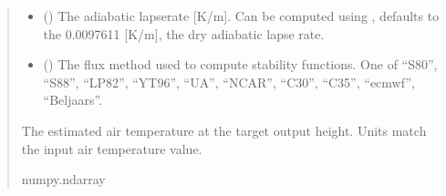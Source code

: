 \documentclass[letterpaper,10pt,english]{sphinxmanual}
\begin{document}
\begin{fulllineitems}
\begin{quote}
\begin{description}
\begin{itemize}
\item {}
\sphinxAtStartPar
{} (\sphinxstyleliteralemphasis{\sphinxupquote{ | }}) \textendash{} The adiabatic lapse\sphinxhyphen{}rate {[}K/m{]}. Can be computed using
{\hyperref[\detokenize{users_guide:AirSeaFluxCode.hum_subs.gamma}]{}}, defaults to the 0.0097611 {[}K/m{]}, the
dry adiabatic lapse rate.

\item {}
\sphinxAtStartPar
{} () \textendash{} The flux method used to compute stability functions. One of “S80”, “S88”,
“LP82”, “YT96”, “UA”, “NCAR”, “C30”, “C35”, “ecmwf”, “Beljaars”.

\end{itemize}

\sphinxAtStartPar
The estimated air temperature at the target output height. Units match
the input air temperature value.

\sphinxAtStartPar
numpy.ndarray

\end{description}\end{quote}

\end{fulllineitems}

\end{document}
